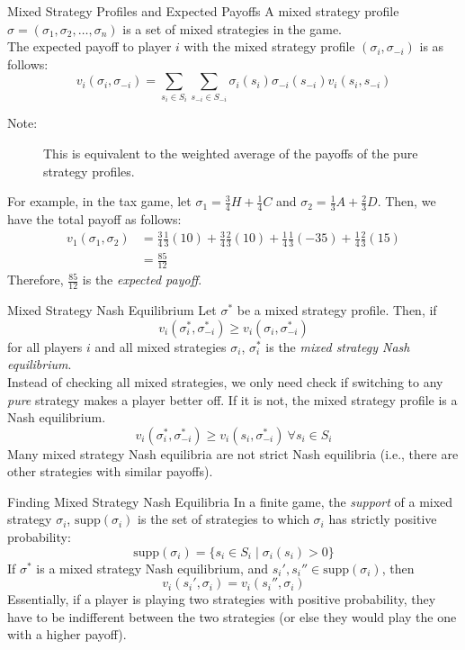 \documentclass[8pt]{extarticle}
\begin{document}
  \begin{problem}{Mixed Strategy Profiles and Expected Payoffs}
    A mixed strategy profile $\sigma = (\sigma_1,\sigma_2,\dots,\sigma_n)$ is a set of mixed strategies in the game.\\

    The expected payoff to player $i$ with the mixed strategy profile $(\sigma_i, \sigma_{-i})$ is as follows:
    \[
      v_i(\sigma_i,\sigma_{-i}) = \sum_{s_i\in S_i}\sum_{s_{-i}\in S_{-i}}\sigma_i(s_i)\sigma_{-i}(s_{-i})v_i(s_i,s_{-i})
    \] 
    \begin{description}
      \item[Note:] This is equivalent to the weighted average of the payoffs of the pure strategy profiles.
    \end{description}
    For example, in the tax game, let $\sigma_1 = \frac{3}{4}H + \frac{1}{4}C$ and $\sigma_2 = \frac{1}{3}A + \frac{2}{3}D$. Then, we have the total payoff as follows:
    \begin{align*}
      v_1(\sigma_1,\sigma_2) &= \frac{3}{4}\frac{1}{3}(10) + \frac{3}{4}\frac{2}{3}(10) + \frac{1}{4}\frac{1}{3}(-35) + \frac{1}{4}\frac{2}{3}(15)\\
                             &= \frac{85}{12}
    \end{align*}
    Therefore, $\frac{85}{12}$ is the \textit{expected payoff}.
  \end{problem}
  \begin{problem}{Mixed Strategy Nash Equilibrium}
    Let $\sigma^*$ be a mixed strategy profile. Then, if
    \[
      v_i(\sigma^*_i,\sigma^*_{-i}) \geq v_i(\sigma_i,\sigma^*_{-i})
    \] 
    for all players $i$ and all mixed strategies $\sigma_i$, $\sigma^*_i$ is the \textit{mixed strategy Nash equilibrium}.\\

    Instead of checking all mixed strategies, we only need check if switching to any \textit{pure} strategy makes a player better off. If it is not, the mixed strategy profile is a Nash equilibrium.
    \[
      v_i(\sigma^*_i,\sigma^*_{-i}) \geq v_i(s_i,\sigma^*_{-i})~\forall s_i\in S_i
    \] 
    Many mixed strategy Nash equilibria are not strict Nash equilibria (i.e., there are other strategies with similar payoffs).
  \end{problem}
  \begin{problem}{Finding Mixed Strategy Nash Equilibria}
    In a finite game, the \textit{support} of a mixed strategy $\sigma_i$, $\text{supp}(\sigma_i)$ is the set of strategies to which $\sigma_i$ has strictly positive probability:
    \[
      \text{supp}(\sigma_i) = \{s_i\in S_i \mid \sigma_i(s_i) > 0\}
    \]
    If $\sigma^*$ is a mixed strategy Nash equilibrium, and $s_i',s_i'' \in \text{supp}(\sigma_i)$, then
    \[
      v_i(s_i',\sigma_i) = v_i(s_i'',\sigma_i)
    \] 
    Essentially, if a player is playing two strategies with positive probability, they have to be indifferent between the two strategies (or else they would play the one with a higher payoff).
  \end{problem}
\end{document}
